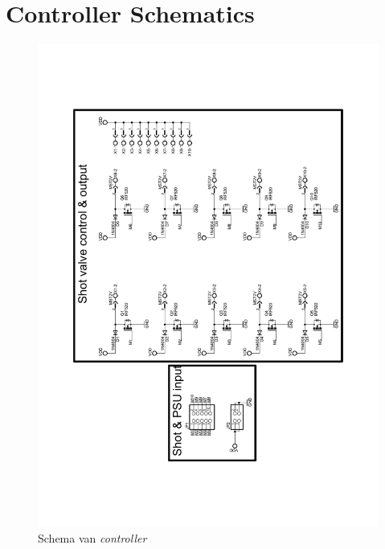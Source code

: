 \chapter{Controller Schematics}
\label{app:launcher-schematic}

\begin{figure}
    \includegraphics[scale=0.5]{figures/controller_schematic.pdf}
    \caption{Schema van \emph{controller}}
\end{figure}
